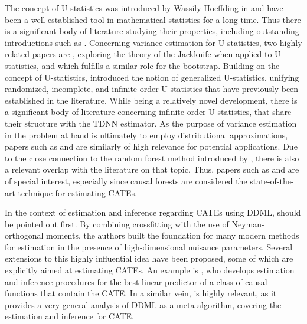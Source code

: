 The concept of U-statistics was introduced by Wassily Hoeffding in
\citet{hoeffding_class_1948} and have been a well-established tool in
mathematical statistics for a long time. Thus there is a significant body of
literature studying their properties, including outstanding introductions such
as \citet{lee_u-statistics_2019}. Concerning variance estimation for
U-statistics, two highly related papers are \citet{arvesen_jackknifing_1969},
exploring the theory of the Jackknife when applied to U-statistics, and
\citet{arcones_bootstrap_1992} which fulfills a similar role for the bootstrap.
Building on the concept of U-statistics, \citet{peng_rates_2022} introduced the
notion of generalized U-statistics, unifying randomized, incomplete, and
infinite-order U-statistics that have previously been established in the
literature. While being a relatively novel development, there is a significant
body of literature concerning infinite-order U-statistics, that share their
structure with the TDNN estimator. As the purpose of variance estimation in the
problem at hand is ultimately to employ distributional approximations, papers
such as \citet{chen_randomized_2019} and \citet{song_approximating_2019} are
similarly of high relevance for potential applications. Due to the close
connection to the random forest method introduced by
\citet{breiman_random_2001}, there is also a relevant overlap with the
literature on that topic. Thus, papers such as \citet{wager2014confidence} and
\citet{wager_estimation_2018} are of special interest, especially since causal forests are considered the state-of-the-art technique for estimating CATEs.

In the context of estimation and inference regarding CATEs using DDML, \citet{chernozhukov_doubledebiased_2018} should be pointed out first.
By combining crossfitting with the use of Neyman-orthogonal moments, the authors built the foundation for many modern methods for estimation in the presence of high-dimensional nuisance parameters.
Several extensions to this highly influential idea have been proposed, some of which are explicitly aimed at estimating CATEs.
An example is \citet{semenova_debiased_2021}, who develops estimation and inference procedures for the best linear predictor of a class of causal functions that contain the CATE.
In a similar vein, \citet{chernozhukov_simple_2022} is highly relevant, as it provides a very general analysis of DDML as a meta-algorithm, covering the estimation and inference for CATE.
